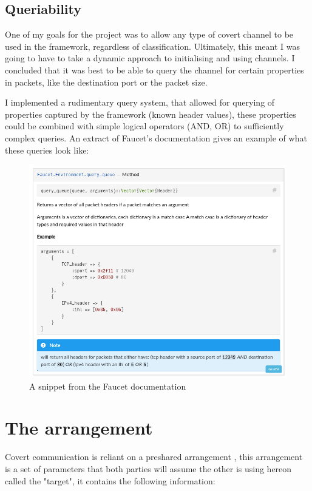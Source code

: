 \subsection{Queriability}

One of my goals for the project was to allow any type of covert channel to be used in the framework, regardless of classification. Ultimately, this meant I was going to have to take a dynamic approach to initialising and using channels. I concluded that it was best to be able to query the channel for certain properties in packets, like the destination port or the packet size.

I implemented a rudimentary query system, that allowed for querying of properties captured by the framework (known header values), these properties could be combined with simple logical operators (AND, OR) to sufficiently complex queries. An extract of Faucet's documentation gives an example of what these queries look like:

\begin{figure}[!h]
    \centering
    \includegraphics[width=\textwidth]{fig/docs_query_queue.png}
    \caption{A snippet from the Faucet documentation}
    \label{fig:doc_snippet}
\end{figure}

\section{The arrangement}
\label{sec:target}

Covert communication is reliant on a preshared arrangement \cite{DoCCaS}, this arrangement is a set of parameters that both parties will assume the other is using hereon called the "target", it contains the following information:

